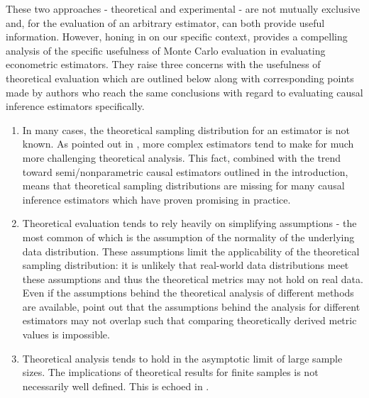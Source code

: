 \documentclass[../main.tex]{subfiles}
\begin{document}
\vspace{\baselineskip}
These two approaches - theoretical and experimental - are not mutually exclusive and, for the evaluation of an arbitrary estimator, can both provide useful information. However, honing in on our specific context, \textcite{Paxton2001MonteImplementation} provides a compelling analysis of the specific usefulness of Monte Carlo evaluation in evaluating econometric estimators. They raise three concerns with the usefulness of theoretical evaluation which are outlined below along with corresponding points made by authors who reach the same conclusions with regard to evaluating causal inference estimators specifically.\par


\vspace{\baselineskip}
\begin{enumerate}
    \item In many cases, the theoretical sampling distribution for an estimator is not known. As pointed out in \textcite{Knaus2018MachineEvidence}, more complex estimators tend to make for much more challenging theoretical analysis. This fact, combined with the trend toward semi/nonparametric causal estimators outlined in the introduction, means that theoretical sampling distributions are missing for many causal inference estimators which have proven promising in practice.\par


\vspace{\baselineskip}
    \item Theoretical evaluation tends to rely heavily on simplifying assumptions - the most common of which is the assumption of the normality of the underlying data distribution. These assumptions limit the applicability of the theoretical sampling distribution: it is unlikely that real-world data distributions meet these assumptions and thus the theoretical metrics may not hold on real data. Even if the assumptions behind the theoretical analysis of different methods are available, \textcite{Knaus2018MachineEvidence} point out that the assumptions behind the analysis for different estimators may not overlap such that comparing theoretically derived metric values is impossible.\par


\vspace{\baselineskip}
    \item Theoretical analysis tends to hold in the asymptotic limit of large sample sizes. The implications of theoretical results for finite samples is not necessarily well defined. This is echoed in \textcite{Huber2013TheScore}.
\end{enumerate}\par
\end{document}
